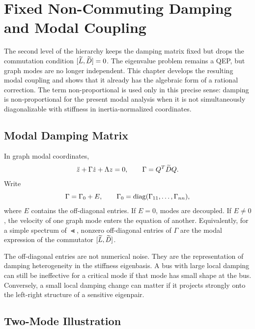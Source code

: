 \chapter{Fixed Non-Commuting Damping and Modal Coupling}

The second level of the hierarchy keeps the damping matrix fixed but drops the
commutation condition \([\widetilde L,\widetilde D]=0\). The eigenvalue problem remains a QEP,
but graph modes are no longer independent. This chapter develops the resulting
modal coupling and shows that it already has the algebraic form of a rational
correction. The term non-proportional is used only in this precise sense:
damping is non-proportional for the present modal analysis when it is not
simultaneously diagonalizable with stiffness in inertia-normalized
coordinates.

\section{Modal Damping Matrix}

In graph modal coordinates,
\begin{equation}
  \ddot z+\Gamma\dot z+\Lambda z=0,\qquad
  \Gamma=Q^T\widetilde D Q.
  \label{eq:nonprop_modal_system}
\end{equation}
Write
\begin{equation}
  \Gamma=\Gamma_0+E,\qquad
  \Gamma_0=\operatorname{diag}(\Gamma_{11},\ldots,\Gamma_{nn}),
  \label{eq:nonprop_split}
\end{equation}
where \(E\) contains the off-diagonal entries. If \(E=0\), modes are decoupled.
If \(E\ne0\), the velocity of one graph mode enters the equation of another.
Equivalently, for a simple spectrum of \(\Lt\), nonzero off-diagonal entries
of \(\Gamma\) are the modal expression of the commutator \([\widetilde L,\widetilde D]\).

The off-diagonal entries are not numerical noise. They are the representation
of damping heterogeneity in the stiffness eigenbasis. A bus with large local
damping can still be ineffective for a critical mode if that mode has small
shape at the bus. Conversely, a small local damping change can matter if it
projects strongly onto the left-right structure of a sensitive eigenpair.

\section{Two-Mode Illustration}

